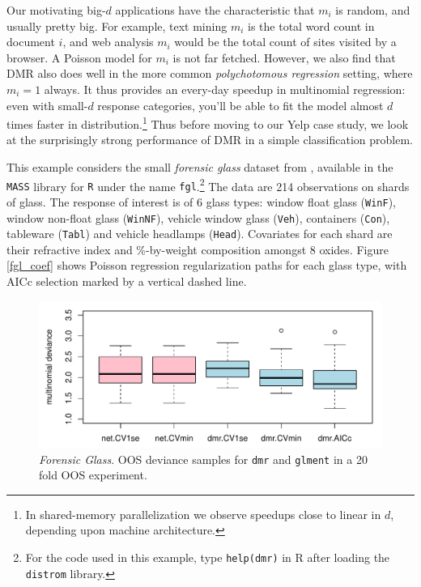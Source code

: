 \documentclass[12pt]{article}
\newcommand{\cd}[1]{{\tt#1}}
\begin{document}
Our motivating big-$d$ applications have the characteristic that $m_i$ is
random, and usually pretty big.  For example, text mining $m_i$ is the total
word count in document $i$, and web analysis $m_i$ would be the total count of
sites visited by a browser.  A Poisson model for $m_i$ is not far fetched.
However, we also find that DMR also does well in the more common {\it
polychotomous regression} setting, where $m_i=1$ always. It thus provides an
every-day speedup in multinomial regression: even with small-$d$ response
categories, you'll be able to fit the model almost $d$ times faster in
distribution.\footnote{In shared-memory parallelization we observe
speedups close to linear in $d$, depending upon machine
architecture.} Thus before moving to our Yelp case study, we look at the
surprisingly strong performance of DMR in a simple classification problem.

This example considers the small {\it forensic glass} dataset from
\citet{venables_modern_2002}, available in the \cd{MASS} library for \cd{R}
under the name \cd{fgl}.\footnote{For the code used in this example, type
\cd{help(dmr)} in R after loading the \cd{distrom} library.}  The data are 214
observations on shards of glass. The response of interest is of 6 glass types:
window float glass (\cd{WinF}), window non-float glass (\cd{WinNF}), vehicle
window glass (\cd{Veh}), containers (\cd{Con}), tableware (\cd{Tabl}) and
vehicle headlamps (\cd{Head}).  Covariates for each shard are their refractive
index and \%-by-weight composition amongst 8 oxides. Figure \ref{fgl_coef}
shows Poisson regression regularization paths for each glass type,
with AICc selection marked by a vertical dashed line.

\begin{figure}
\includegraphics[width=6.25in]{../graphs/fgl_cv}
\caption{\label{fgl_cv}  {\it Forensic Glass}. OOS deviance samples for \cd{dmr} and \cd{glment} in a 20 fold OOS experiment.  }\end{figure}
\end{document}
